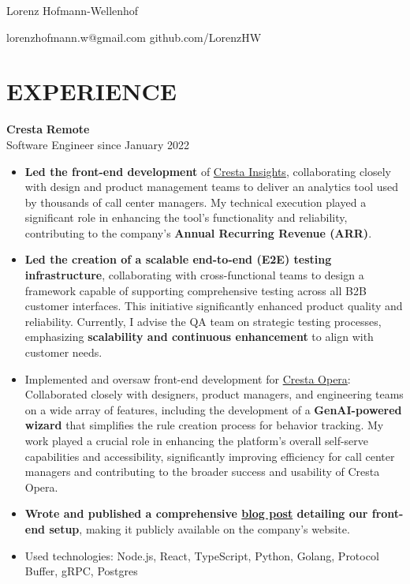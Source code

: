 \documentclass{memoir}
\begin{document}
\begin{center}
\Large{Lorenz Hofmann-Wellenhof}
\end{center}
\small{lorenzhofmann.w@gmail.com}
\hfill
\small{github.com/LorenzHW}


\section*{EXPERIENCE}
\textbf{Cresta}
\hfill
\textbf{Remote} \\
Software Engineer
\hfill
since January 2022
\begin{itemize}[noitemsep]
  \item \textbf{Led the front-end development} of \href{https://cresta.com/product/insights/}{Cresta Insights}, collaborating closely with design and product management teams to deliver an analytics tool used by thousands of call center managers. My technical execution played a significant role in enhancing the tool's functionality and reliability, contributing to the company's \textbf{Annual Recurring Revenue (ARR)}.
  \item \textbf{Led the creation of a scalable end-to-end (E2E) testing infrastructure}, collaborating with cross-functional teams to design a framework capable of supporting comprehensive testing across all B2B customer interfaces. This initiative significantly enhanced product quality and reliability. Currently, I advise the QA team on strategic testing processes, emphasizing \textbf{scalability and continuous enhancement} to align with customer needs.
  \item Implemented and oversaw front-end development for \href{https://cresta.com/videos/cresta-opera-demo/}{Cresta Opera}: Collaborated closely with designers, product managers, and engineering teams on a wide array of features, including the development of a \textbf{GenAI-powered wizard} that simplifies the rule creation process for behavior tracking. My work played a crucial role in enhancing the platform's overall self-serve capabilities and accessibility, significantly improving efficiency for call center managers and contributing to the broader success and usability of Cresta Opera.
  \item \textbf{Wrote and published a comprehensive \href{https://cresta.com/blog/streamlining-front-end-development-insights-from-crestas-tech-stack/}{blog post} detailing our front-end setup}, making it publicly available on the company's website.
  \item Used technologies: Node.js, React, TypeScript, Python, Golang, Protocol Buffer, gRPC, Postgres
\end{itemize}
\end{document}
